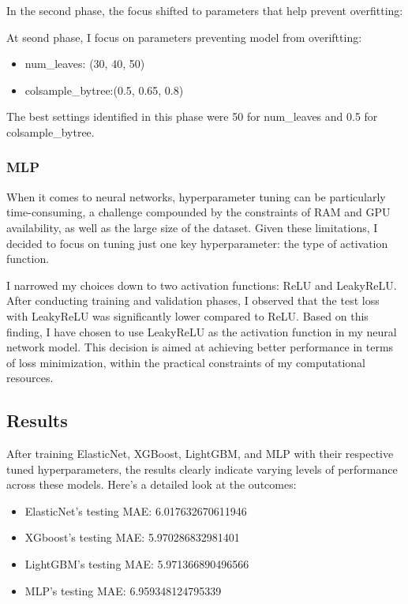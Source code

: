 \documentclass[12pt]{article}
\newtheorem{Proof of Lemma}{Proof of Lemma}
\begin{document}
In the second phase, the focus shifted to parameters that help prevent overfitting:

At seond phase, I focus on parameters preventing model from overiftting:
\begin{itemize}
  \item num\_leaves: (30, 40, 50)
  \item colsample\_bytree:(0.5, 0.65, 0.8)
\end{itemize}
The best settings identified in this phase were 50 for num\_leaves and 0.5 for colsample\_bytree.

\subsubsection*{MLP}

When it comes to neural networks, hyperparameter tuning can be particularly time-consuming, a challenge compounded by the constraints of RAM and GPU availability, as well as the large size of the dataset. Given these limitations, I decided to focus on tuning just one key hyperparameter: the type of activation function.

I narrowed my choices down to two activation functions: ReLU and LeakyReLU. After conducting training and validation phases, I observed that the test loss with LeakyReLU was significantly lower compared to ReLU. Based on this finding, I have chosen to use LeakyReLU as the activation function in my neural network model. This decision is aimed at achieving better performance in terms of loss minimization, within the practical constraints of my computational resources.


\subsection{Results}

After training ElasticNet, XGBoost, LightGBM, and MLP with their respective tuned hyperparameters, the results clearly indicate varying levels of performance across these models. Here's a detailed look at the outcomes:

\begin{itemize}
  \item ElasticNet's testing MAE: 6.017632670611946
  \item XGboost's testing MAE: 5.970286832981401
  \item LightGBM's testing MAE: 5.971366890496566
  \item MLP's testing MAE: 6.959348124795339
\end{itemize}
\end{document}
